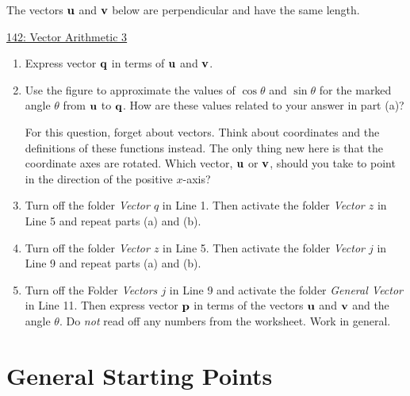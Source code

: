 \documentclass{ximera}
\begin{document}
\begin{question} \label{QLf45445rr33r3}

The vectors ${\bf u}$ and ${\bf v}$ below are perpendicular and have the same length.

\begin{onlineOnly}
    \begin{center}
\end{center}
\end{onlineOnly}

\href{https://www.desmos.com/calculator/gah1mliasn}{142: Vector Arithmetic 3}


\begin{enumerate}
\item Express vector ${\bf q}$ in terms of ${\bf u}$ and ${\bf v}$. 

\item Use the figure to approximate the values of $\cos\theta$ and $\sin\theta$ for the marked angle $\theta$ from ${\bf u}$ to ${\bf q}$. How are these values related to your answer in part (a)? 

For this question, forget about vectors. Think about coordinates and the definitions of these functions instead. The only thing new here is that the coordinate axes are rotated. Which vector, ${\bf u}$ or ${\bf v}$, should you take to point in the direction of the positive $x$-axis?

\item Turn off the folder \emph{Vector $q$} in Line 1. Then activate the folder \emph{Vector $z$} in Line 5 and repeat parts (a) and (b).

\item Turn off the folder \emph{Vector $z$} in Line 5. Then activate the folder \emph{Vector $j$} in Line 9 and repeat parts (a) and (b).


\item Turn off the Folder \emph{Vectors $j$} in Line 9 and activate the folder \emph{General Vector} in Line 11. Then express vector ${\bf p}$ in terms of the vectors ${\bf u}$ and ${\bf v}$ and the angle $\theta$. Do \emph{not} read off any numbers from the worksheet. Work in general.

\end{enumerate}
\end{question}


\section{General Starting Points}
\end{document}
